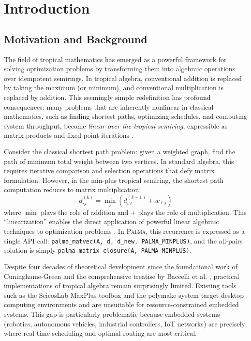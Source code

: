 \documentclass[11pt,a4paper]{article}
\theoremstyle{plain}
\theoremstyle{definition}
\newcommand{\palma}{\textsc{Palma}}
\begin{document}
\section{Introduction}
\label{sec:introduction}

\subsection{Motivation and Background}

The field of tropical mathematics has emerged as a powerful framework for solving optimization problems by transforming them into algebraic operations over idempotent semirings. In tropical algebra, conventional addition is replaced by taking the maximum (or minimum), and conventional multiplication is replaced by addition. This seemingly simple redefinition has profound consequences: many problems that are inherently nonlinear in classical mathematics, such as finding shortest paths, optimizing schedules, and computing system throughput, become \emph{linear over the tropical semiring}, expressible as matrix products and fixed-point iterations \cite{baccelli1992synchronization, butkovic2010max}.

Consider the classical shortest path problem: given a weighted graph, find the path of minimum total weight between two vertices. In standard algebra, this requires iterative comparison and selection operations that defy matrix formulation. However, in the min-plus tropical semiring, the shortest path computation reduces to matrix multiplication:
\begin{equation}
    d_{ij}^{(k)} = \min_{\ell}\left(d_{i\ell}^{(k-1)} + w_{\ell j}\right)
\end{equation}
where $\min$ plays the role of addition and $+$ plays the role of multiplication. This ``linearization'' enables the direct application of powerful linear algebraic techniques to optimization problems \cite{gondran2008graphs, mohri2002semiring}. In \palma{}, this recurrence is expressed as a single API call: \texttt{palma\_matvec(A, d, d\_new, PALMA\_MINPLUS)}, and the all-pairs solution is simply \texttt{palma\_matrix\_closure(A, PALMA\_MINPLUS)}.

Despite four decades of theoretical development since the foundational work of Cuninghame-Green \cite{cuninghame1979minimax} and the comprehensive treatise by Baccelli et al. \cite{baccelli1992synchronization}, practical implementations of tropical algebra remain surprisingly limited. Existing tools such as the ScicosLab MaxPlus toolbox \cite{gaubert2009max} and the polymake system \cite{gawrilow2000polymake, hampe2018tropical} target desktop computing environments and are unsuitable for resource-constrained embedded systems. This gap is particularly problematic because embedded systems (robotics, autonomous vehicles, industrial controllers, IoT networks) are precisely where real-time scheduling and optimal routing are most critical.
\end{document}
